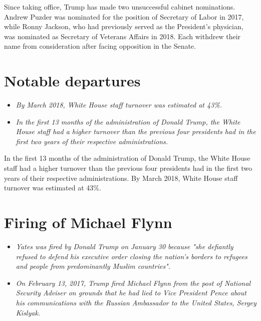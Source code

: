 Since taking office, Trump has made two unsuccessful cabinet
nominations. Andrew Puzder was nominated for the position of Secretary
of Labor in 2017, while Ronny Jackson, who had previously served as the
President's physician, was nominated as Secretary of Veterans Affairs in
2018. Each withdrew their name from consideration after facing
opposition in the Senate.

\section{Notable departures}\label{notable-departures}

\begin{itemize}
\item
  \emph{By March 2018, White House staff turnover was estimated at
  43\%.}
\item
  \emph{In the first 13 months of the administration of Donald Trump,
  the White House staff had a higher turnover than the previous four
  presidents had in the first two years of their respective
  administrations.}
\end{itemize}

In the first 13 months of the administration of Donald Trump, the White
House staff had a higher turnover than the previous four presidents had
in the first two years of their respective administrations. By March
2018, White House staff turnover was estimated at 43\%.

\section{Firing of Michael Flynn}\label{firing-of-michael-flynn}

\begin{itemize}
\item
  \emph{Yates was fired by Donald Trump on January 30 because "she
  defiantly refused to defend his executive order closing the nation's
  borders to refugees and people from predominantly Muslim countries".}
\item
  \emph{On February 13, 2017, Trump fired Michael Flynn from the post of
  National Security Adviser on grounds that he had lied to Vice
  President Pence about his communications with the Russian Ambassador
  to the United States, Sergey Kislyak.}
\end{itemize}


